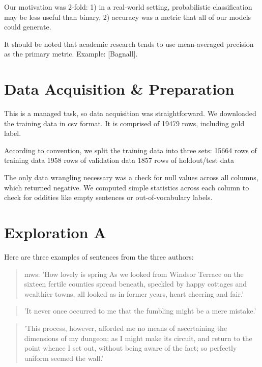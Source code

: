 \documentclass[12pt]{article}
\begin{document}
Our motivation was 2-fold: 1) in a real-world setting, probabilistic classification may be less useful than binary, 2) accuracy was a metric that all of our models could generate.

It should be noted that academic research tends to use mean-averaged precision as the primary metric. Example: [Bagnall].

\section{Data Acquisition \& Preparation}
This is a managed task, so data acquisition was straightforward. We downloaded the training data in csv format. It is comprised of 19479 rows, including gold label.

According to convention, we split the training data into three sets:
15664 rows of training data
1958 rows of validation data
1857 rows of holdout/test data

The only data wrangling necessary was a check for null values across all columns, which returned negative. We computed simple statistics across each column to check for oddities like empty sentences or out-of-vocabulary labels.


\section{Exploration A}

Here are three examples of sentences from the three authors:

\begin{quote}mws: 'How lovely is spring As we looked from Windsor Terrace on the sixteen fertile counties spread beneath, speckled by happy cottages and wealthier towns, all looked as in former years, heart cheering and fair.'
\end{quote}

\begin{quote}'It never once occurred to me that the fumbling might be a mere mistake.'
\end{quote}

\begin{quote}'This process, however, afforded me no means of ascertaining the dimensions of my dungeon; as I might make its circuit, and return to the point whence I set out, without being aware of the fact; so perfectly uniform seemed the wall.'
\end{quote}
\end{document}
